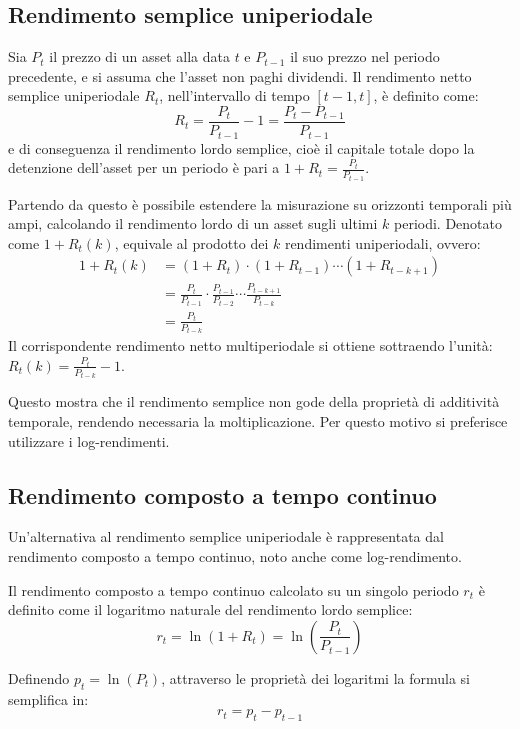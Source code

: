 \subsection{Rendimento semplice uniperiodale}
Sia $P_t$ il prezzo di un asset alla data $t$ e $P_{t-1}$ il suo prezzo nel periodo precedente, e si assuma che l'asset non paghi dividendi\cite{campbell:econometrics}.
Il rendimento netto semplice uniperiodale $R_t$, nell'intervallo di tempo $[t - 1, t]$, è definito come:
\[
    R_t = \frac{P_t}{P_{t-1}} - 1 = \frac{P_t - P_{t-1}}{P_{t-1}}
\]
e di conseguenza il rendimento lordo semplice, cioè il capitale totale dopo la detenzione dell'asset per un periodo è pari a $1 + R_t = \frac{P_t}{P_{t-1}}$.

Partendo da questo è possibile estendere la misurazione su orizzonti temporali più ampi, calcolando il rendimento lordo di un asset sugli ultimi $k$ periodi.
Denotato come $1 + R_t(k)$, equivale al prodotto dei $k$ rendimenti uniperiodali, ovvero:
\begin{equation*}
\begin{split}
    1 + R_t(k) &= (1 + R_t) \cdot (1 + R_{t-1}) \cdots (1 + R_{t-k+1}) \\
               &= \frac{P_t}{P_{t-1}} \cdot \frac{P_{t-1}}{P_{t-2}} \cdots \frac{P_{t-k+1}}{P_{t-k}} \\
               &= \frac{P_t}{P_{t-k}}
\end{split}
\end{equation*}
Il corrispondente rendimento netto multiperiodale si ottiene sottraendo l'unità: $R_t(k) = \frac{P_t}{P_{t-k}} - 1$.

Questo mostra che il rendimento semplice non gode della proprietà di additività temporale, rendendo necessaria la moltiplicazione. Per questo motivo si preferisce utilizzare i log-rendimenti.


\subsection{Rendimento composto a tempo continuo}
Un'alternativa al rendimento semplice uniperiodale è rappresentata dal rendimento composto a tempo continuo, noto anche come log-rendimento.

Il rendimento composto a tempo continuo calcolato su un singolo periodo $r_t$ è definito come il logaritmo naturale del rendimento lordo semplice:
\[
    r_t = \ln(1 + R_t) = \ln\left(\frac{P_t}{P_{t-1}}\right)
\]

Definendo $p_t = \ln(P_t)$, attraverso le proprietà dei logaritmi la formula si semplifica in: 
\[
    r_t = p_t - p_{t-1}
\]

